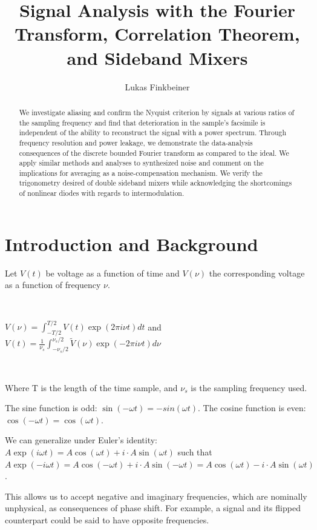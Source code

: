 \documentclass[a4paper]{article}
\title{Signal Analysis with the Fourier Transform, Correlation Theorem, and Sideband Mixers}
\author{Lukas Finkbeiner}
\begin{document}
\maketitle

\begin{abstract}

We investigate aliasing and confirm the Nyquist criterion by signals at various ratios of the sampling frequency and find that deterioration in the sample's facsimile is independent of the ability to reconstruct the signal with a power spectrum. Through frequency resolution and power leakage, we demonstrate the data-analysis consequences of the discrete bounded Fourier transform as compared to the ideal. We apply similar methods and analyses to synthesized noise and comment on the implications for averaging as a noise-compensation mechanism. We verify the trigonometry desired of double sideband mixers while acknowledging the shortcomings of nonlinear diodes with regards to intermodulation.

\end{abstract}


\section{Introduction and Background}

Let $V(t)$ be voltage as a function of time and $V(\nu)$ the corresponding voltage as a function of frequency $\nu$.

\

$V(\nu) = \int_{-T / 2}^{T / 2} V(t) \exp(2 \pi i \nu t) dt$ and $V(t) = \frac{1}{\nu_s} \int_{- \nu_s / 2}^{\nu_s / 2} \tilde{V}(\nu) \exp(-2 \pi i \nu t) d \nu$

\

Where T is the length of the time sample, and $\nu_s$ is the sampling frequency used.




The sine function is odd: $\sin(-\omega t) = -sin(\omega t)$. The cosine function is even: $\cos(-\omega t) = \cos (\omega t)$.

We can generalize under Euler's identity: $A\exp(i \omega t) = A \cos(\omega t) + i \cdot A \sin(\omega t)$ such that $A\exp(-i \omega t) = A \cos(-\omega t) + i \cdot A \sin(-\omega t) = A \cos(\omega t) - i \cdot A \sin(\omega t)$.

This allows us to accept negative and imaginary frequencies, which are nominally unphysical, as consequences of phase shift. For example, a signal and its flipped counterpart could be said to have opposite frequencies.
\end{document}
